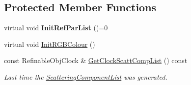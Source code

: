 \subsection*{Protected Member Functions}
\begin{DoxyCompactItemize}
\item 
\mbox{\label{class_obj_cryst_1_1_scatterer_a45ef328b68a0a68c0228beefc25cda7f}} 
virtual void {\bfseries Init\+Ref\+Par\+List} ()=0
\item 
virtual void \mbox{\hyperlink{class_obj_cryst_1_1_scatterer_a3edeffbf1cf3223663d9a7aa4bd321b1}{Init\+R\+G\+B\+Colour}} ()
\item 
\mbox{\label{class_obj_cryst_1_1_scatterer_a238c21a4d2a4dfde6a8c0027a7cb8963}} 
const Refinable\+Obj\+Clock \& \mbox{\hyperlink{class_obj_cryst_1_1_scatterer_a238c21a4d2a4dfde6a8c0027a7cb8963}{Get\+Clock\+Scatt\+Comp\+List}} () const
\begin{DoxyCompactList}\small\item\em Last time the \mbox{\hyperlink{class_obj_cryst_1_1_scattering_component_list}{Scattering\+Component\+List}} was generated. \end{DoxyCompactList}\end{DoxyCompactItemize}
